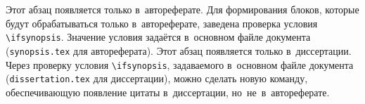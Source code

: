 

{\actuality} 


\ifsynopsis
Этот абзац появляется только в~автореферате.
Для формирования блоков, которые будут обрабатываться только в~автореферате,
заведена проверка условия \verb!\!\verb!ifsynopsis!.
Значение условия задаётся в~основном файле документа (\verb!synopsis.tex! для
автореферата).
\else
Этот абзац появляется только в~диссертации.
Через проверку условия \verb!\!\verb!ifsynopsis!, задаваемого в~основном файле
документа (\verb!dissertation.tex! для диссертации), можно сделать новую
команду, обеспечивающую появление цитаты в~диссертации, но~не~в~автореферате.
\fi

